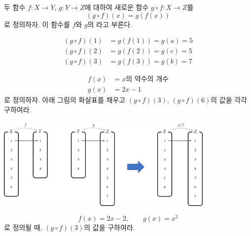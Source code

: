 \documentclass{oblivoir}
\begin{document}
\begin{mdframed}
%
\label{composition2}
두 함수 \(f:X\to Y\), \(g:Y\to Z\)에 대하여 새로운 함수 \(g\circ f:X\to Z\)를
\[(g\circ f)(x)=g(f(x))\]
로 정의하자.
이 함수를 \(f\)와 \(g\)의 라고 부른다.
\end{mdframed}

%
\label{composition3}
\begin{align*}
(g\circ f)(1)&=g(f(1))=g(a)=5\\
(g\circ f)(2)&=g(f(2))=g(c)=5\\
(g\circ f)(3)&=g(f(3))=g(b)=7
\end{align*}

%
\label{composition4}
\begin{align*}
f(x)&=x\text{의 약수의 개수}\\
g(x)&=2x-1
\end{align*}
로 정의하자.
아래 그림의 화살표를 채우고 \((g\circ f)(3)\), \((g\circ f)(6)\)의 값을 각각 구하여라.
\begin{center}
\includegraphics[width=0.8\textwidth]{composition_4}
\end{center}

%
\label{composition5}
\[f(x)=2x-2,\qquad g(x)=x^2\]
로 정의될 때, \((g\circ f)(3)\)의 값을 구하여라.
\end{document}
